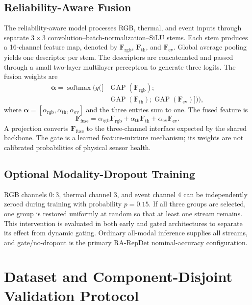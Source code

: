 \documentclass[pdflatex,sn-basic,Numbered,iicol]{sn-jnl}
\begin{document}
\subsection{Reliability-Aware Fusion}
The reliability-aware model processes RGB, thermal, and event inputs through separate $3\times3$ convolution--batch-normalization--SiLU stems. Each stem produces a 16-channel feature map, denoted by $\mathbf{F}_{\mathrm{rgb}}$, $\mathbf{F}_{\mathrm{th}}$, and $\mathbf{F}_{\mathrm{ev}}$. Global average pooling yields one descriptor per stem. The descriptors are concatenated and passed through a small two-layer multilayer perceptron to generate three logits. The fusion weights are
\begin{equation}
\begin{aligned}
\boldsymbol{\alpha}=\operatorname{softmax}\bigl(g([&\operatorname{GAP}(\mathbf{F}_{\mathrm{rgb}});\\
&\operatorname{GAP}(\mathbf{F}_{\mathrm{th}});\operatorname{GAP}(\mathbf{F}_{\mathrm{ev}})])\bigr),
\end{aligned}
\end{equation}
where $\boldsymbol{\alpha}=[\alpha_{\mathrm{rgb}},\alpha_{\mathrm{th}},\alpha_{\mathrm{ev}}]$ and the three entries sum to one. The fused feature is
\begin{equation}
\mathbf{F}_{\mathrm{fuse}}=\alpha_{\mathrm{rgb}}\mathbf{F}_{\mathrm{rgb}}+\alpha_{\mathrm{th}}\mathbf{F}_{\mathrm{th}}+\alpha_{\mathrm{ev}}\mathbf{F}_{\mathrm{ev}}.
\end{equation}
A projection converts $\mathbf{F}_{\mathrm{fuse}}$ to the three-channel interface expected by the shared backbone. The gate is a learned feature-mixture mechanism; its weights are not calibrated probabilities of physical sensor health.

\subsection{Optional Modality-Dropout Training}
RGB channels $0{:}3$, thermal channel 3, and event channel 4 can be independently zeroed during training with probability $p=0.15$. If all three groups are selected, one group is restored uniformly at random so that at least one stream remains. This intervention is evaluated in both early and gated architectures to separate its effect from dynamic gating. Ordinary all-modal inference supplies all streams, and gate/no-dropout is the primary RA-RepDet nominal-accuracy configuration.

\section{Dataset and Component-Disjoint Validation Protocol}
\end{document}
